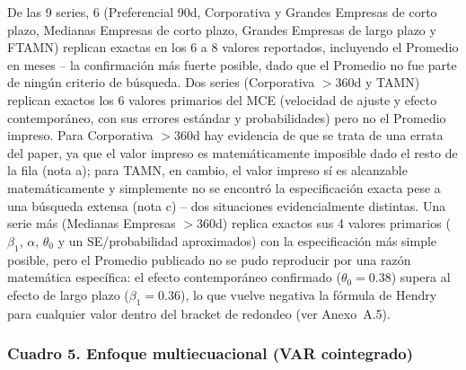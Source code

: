 \documentclass[12pt, letterpaper]{article}
\begin{document}
De las 9 series, 6 (Preferencial 90d, Corporativa y Grandes Empresas de
corto plazo, Medianas Empresas de corto plazo, Grandes Empresas de
largo plazo y FTAMN) replican exactas en los 6 a 8 valores reportados,
incluyendo el Promedio en meses -- la confirmación más fuerte posible,
dado que el Promedio no fue parte de ningún criterio de búsqueda. Dos
series (Corporativa $>$360d y TAMN) replican exactos los 6 valores
primarios del MCE (velocidad de ajuste y efecto contemporáneo, con sus
errores estándar y probabilidades) pero no el Promedio impreso. Para
Corporativa $>$360d hay evidencia de que se trata de una errata del
paper, ya que el valor impreso es matemáticamente imposible dado el
resto de la fila (nota a); para TAMN, en cambio, el valor impreso sí
es alcanzable matemáticamente y simplemente no se encontró la
especificación exacta pese a una búsqueda extensa (nota c) -- dos
situaciones evidencialmente distintas. Una serie más (Medianas
Empresas $>$360d) replica exactos sus 4 valores primarios ($\beta_1$,
$\alpha$, $\theta_0$ y un SE/probabilidad aproximados) con la
especificación más simple posible, pero el Promedio publicado no se
pudo reproducir por una razón matemática específica: el efecto
contemporáneo confirmado ($\theta_0=0.38$) supera al efecto de largo
plazo ($\beta_1=0.36$), lo que vuelve negativa la fórmula de Hendry
para cualquier valor dentro del bracket de redondeo (ver Anexo~A.5).

\subsubsection{Cuadro 5. Enfoque multiecuacional (VAR cointegrado)}
\end{document}

